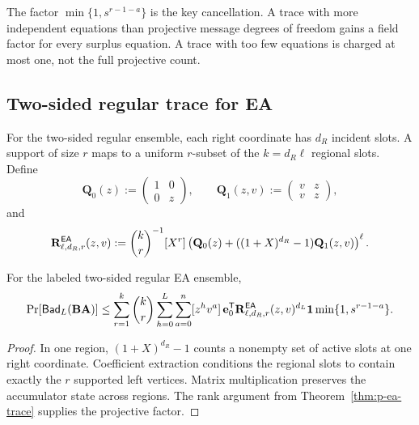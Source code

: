 The factor $\min\{1,s^{r-1-a}\}$ is the key cancellation.  A trace with more
independent equations than projective message degrees of freedom gains a
field factor for every surplus equation.  A trace with too few equations is
charged at most one, not the full projective count.

\subsection{Two-sided regular trace for EA}

For the two-sided regular ensemble, each right coordinate has $d_R$ incident
slots.  A support of size $r$ maps to a uniform $r$-subset of the
$k=d_R\ell$ regional slots.  Define
\begin{equation}
 \mathbf Q_0(z):=\begin{pmatrix}1&0\\0&z\end{pmatrix},
 \qquad
 \mathbf Q_1(z,v):=\begin{pmatrix}v&z\\v&z\end{pmatrix},
 \label{eq:p-ea-regular-trace-inputs}
\end{equation}
and
\begin{equation}
 \mathbf R^{\mathsf{EA}}_{\ell,d_R,r}(z,v):=
 \binom{k}{r}^{-1}[X^r]
 \left(\mathbf Q_0(z)+
 ((1+X)^{d_R}-1)\mathbf Q_1(z,v)\right)^\ell.
 \label{eq:p-ea-biregular-region}
\end{equation}

\begin{theorem}
\label{thm:p-ea-biregular-trace}
For the labeled two-sided regular EA ensemble,
\begin{equation}
 \Pr[\mathsf{Bad}_L(\mathbf B\mathbf A)]\leq
 \sum_{r=1}^{k}\binom{k}{r}
 \sum_{h=0}^{L}\sum_{a=0}^{n}[z^hv^a]\,
 \mathbf e_0^{\mathsf T}
 \mathbf R^{\mathsf{EA}}_{\ell,d_R,r}(z,v)^{d_L}\mathbf 1
 \min\{1,s^{r-1-a}\}.
 \label{eq:p-ea-biregular-trace}
\end{equation}
\end{theorem}

\begin{proof}
In one region, $(1+X)^{d_R}-1$ counts a nonempty set of active slots at one
right coordinate.  Coefficient extraction conditions the regional slots to
contain exactly the $r$ supported left vertices.  Matrix multiplication
preserves the accumulator state across regions.  The rank argument from
Theorem~\ref{thm:p-ea-trace} supplies the projective factor.
\end{proof}

